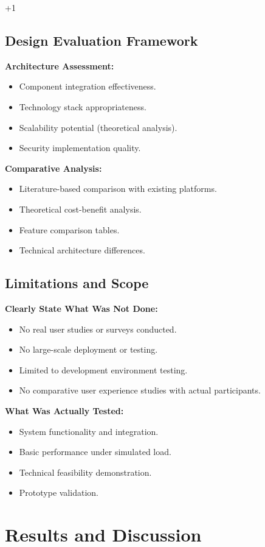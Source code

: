 +1\documentclass[conference]{IEEEtran}
\begin{document}
\subsection{Design Evaluation Framework}
\textbf{Architecture Assessment:}
\begin{itemize}
    \item Component integration effectiveness.
    \item Technology stack appropriateness.
    \item Scalability potential (theoretical analysis).
    \item Security implementation quality.
\end{itemize}

\textbf{Comparative Analysis:}
\begin{itemize}
    \item Literature-based comparison with existing platforms.
    \item Theoretical cost-benefit analysis.
    \item Feature comparison tables.
    \item Technical architecture differences.
\end{itemize}

\subsection{Limitations and Scope}
\textbf{Clearly State What Was Not Done:}
\begin{itemize}
    \item No real user studies or surveys conducted.
    \item No large-scale deployment or testing.
    \item Limited to development environment testing.
    \item No comparative user experience studies with actual participants.
\end{itemize}

\textbf{What Was Actually Tested:}
\begin{itemize}
    \item System functionality and integration.
    \item Basic performance under simulated load.
    \item Technical feasibility demonstration.
    \item Prototype validation.
\end{itemize}

\section{Results and Discussion}
\end{document}
